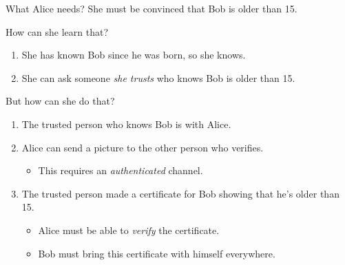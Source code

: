 \begin{frame}
  \begin{block}{What Alice needs?}
    She must be convinced that Bob is older than 15.
  \end{block}

  \pause{}

  \begin{alertblock}{How can she learn that?}
    \begin{enumerate}
      \item She has known Bob since he was born, so she knows.

        \pause{}

      \item She can ask someone \emph{she trusts} who knows Bob is older than 
        15.
    \end{enumerate}
  \end{alertblock}
\end{frame}

\begin{frame}
  \begin{alertblock}{But how can she do that?}
    \begin{enumerate}
      \item The trusted person who knows Bob is with Alice.

        \pause{}

      \item Alice can send a picture to the other person who verifies.
        \begin{itemize}
          \item This requires an \emph{authenticated} channel.
        \end{itemize}

        \pause{}

      \item The trusted person made a certificate for Bob showing that he's 
        older than 15.
        \begin{itemize}
          \item Alice must be able to \emph{verify} the certificate.
          \item Bob must bring this certificate with himself everywhere.
        \end{itemize}

    \end{enumerate}
  \end{alertblock}
\end{frame}

